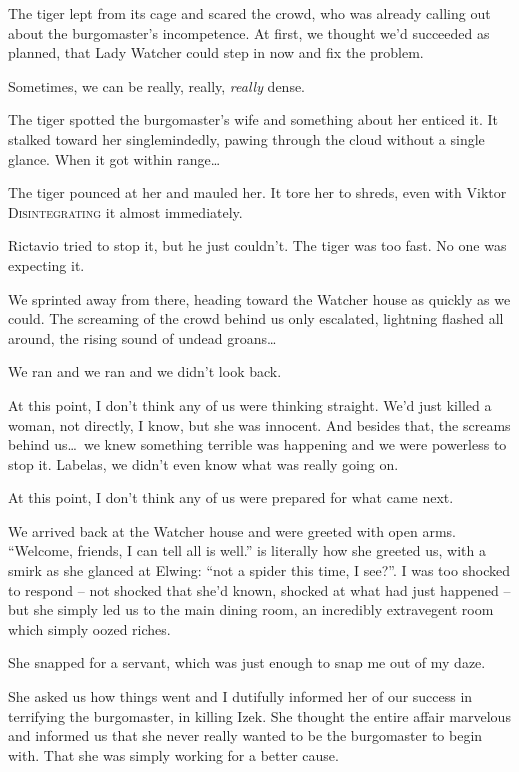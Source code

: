 The tiger lept from its cage and scared the crowd, who was already calling out about the burgomaster's incompetence. At first, we thought we'd succeeded as planned, that Lady Watcher could step in now and fix the problem.

Sometimes, we can be really, really, \emph{really} dense.

The tiger spotted the burgomaster's wife and something about her enticed it. It stalked toward her singlemindedly, pawing through the cloud without a single glance. When it got within range\dots

The tiger pounced at her and mauled her. It tore her to shreds, even with Viktor \textsc{Disintegrating} it almost immediately.

Rictavio tried to stop it, but he just couldn't. The tiger was too fast. No one was expecting it.

We sprinted away from there, heading toward the Watcher house as quickly as we could. The screaming of the crowd behind us only escalated, lightning flashed all around, the rising sound of undead groans\dots

We ran and we ran and we didn't look back.

\pause

At this point, I don't think any of us were thinking straight. We'd just killed a woman, not directly, I know, but she was innocent. And besides that, the screams behind us\dots\ we knew something terrible was happening and we were powerless to stop it. Labelas, we didn't even know what was really going on.

At this point, I don't think any of us were prepared for what came next.

We arrived back at the Watcher house and were greeted with open arms. ``Welcome, friends, I can tell all is well.'' is literally how she greeted us, with a smirk as she glanced at Elwing: ``not a spider this time, I see?''. I was too shocked to respond -- not shocked that she'd known, shocked at what had just happened -- but she simply led us to the main dining room, an incredibly extravegent room which simply oozed riches.

She snapped for a servant, which was just enough to snap me out of my daze.

She asked us how things went and I dutifully informed her of our success in terrifying the burgomaster, in killing Izek. She thought the entire affair marvelous and informed us that she never really wanted to be the burgomaster to begin with. That she was simply working for a better cause.

